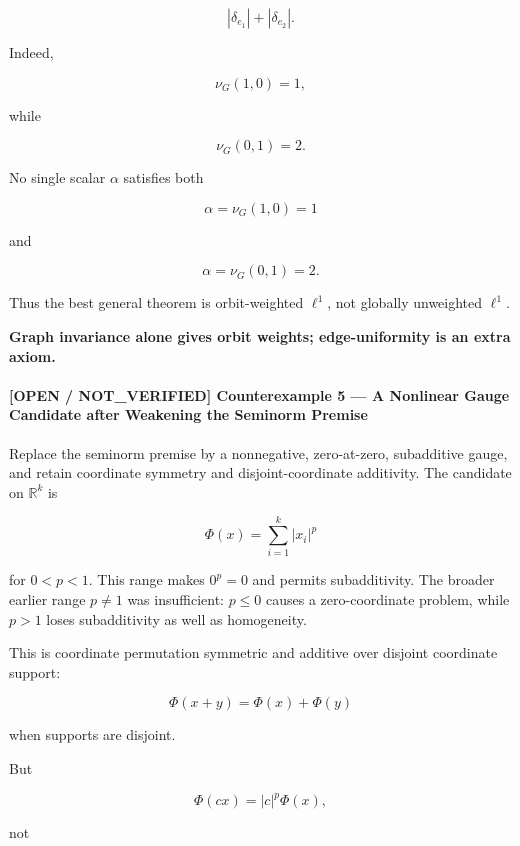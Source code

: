 \documentclass[
  11pt,
]{article}
\renewenvironment{quote}
  {\begin{leftbar}\small}
  {\end{leftbar}}
\begin{document}
\[
|\delta_{e_1}|+|\delta_{e_2}|.
\]

Indeed,

\[
\nu_G(1,0)=1,
\]

while

\[
\nu_G(0,1)=2.
\]

No single scalar \(\alpha\) satisfies both

\[
\alpha=\nu_G(1,0)=1
\]

and

\[
\alpha=\nu_G(0,1)=2.
\]

Thus the best general theorem is orbit-weighted \(\ell^1\), not globally
unweighted \(\ell^1\).

\begin{quote}
\textbf{Graph invariance alone gives orbit weights; edge-uniformity is
an extra axiom.}
\end{quote}

\hypertarget{open-not_verified-counterexample-5-a-nonlinear-gauge-candidate-after-weakening-the-seminorm-premise}{%
\paragraph{\texorpdfstring{\textbf{{[}OPEN / NOT\_VERIFIED{]}
Counterexample 5 --- A Nonlinear Gauge Candidate after Weakening the
Seminorm
Premise}}{{[}OPEN / NOT\_VERIFIED{]} Counterexample 5 --- A Nonlinear Gauge Candidate after Weakening the Seminorm Premise}}\label{open-not_verified-counterexample-5-a-nonlinear-gauge-candidate-after-weakening-the-seminorm-premise}}

Replace the seminorm premise by a nonnegative, zero-at-zero, subadditive
gauge, and retain coordinate symmetry and disjoint-coordinate
additivity. The candidate on \(\mathbb R^k\) is

\[
\Phi(x)=\sum_{i=1}^k |x_i|^p
\]

for \(0<p<1\). This range makes \(0^p=0\) and permits subadditivity. The
broader earlier range \(p\ne1\) was insufficient: \(p\le0\) causes a
zero-coordinate problem, while \(p>1\) loses subadditivity as well as
homogeneity.

This is coordinate permutation symmetric and additive over disjoint
coordinate support:

\[
\Phi(x+y)=\Phi(x)+\Phi(y)
\]

when supports are disjoint.

But

\[
\Phi(cx)=|c|^p\Phi(x),
\]

not
\end{document}
